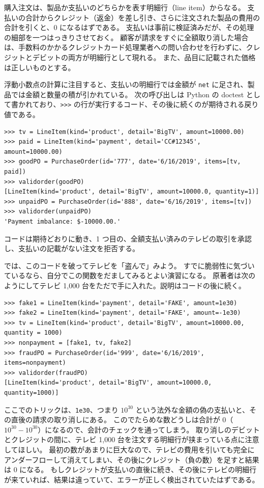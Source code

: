 \documentclass[uplatex]{jsarticle}
\def\label#1{}%
\begin{document}
購入注文は、製品か支払いのどちらかを表す明細行（line item）からなる。
支払いの合計からクレジット（返金）を差し引き、さらに注文された製品の費用の合計を引くと、0 になるはずである。
支払いは事前に検証済みだが、その処理の細部を一つはっきりさせておく。
顧客が請求をすぐに全額取り消した場合は、手数料のかかるクレジットカード処理業者への問い合わせを行わずに、クレジットとデビットの両方が明細行として現れる。
また、品目に記載された価格は正しいものとする。

浮動小数点の計算に注目すると、支払いの明細行では金額が \texttt{net} に足され、製品では金額と数量の積が引かれている。
次の呼び出しは Python の doctest として書かれており、\verb|>>>| の行が実行するコード、その後に続くのが期待される戻り値である。

\begin{verbatim}
>>> tv = LineItem(kind='product', detail='BigTV', amount=10000.00)
>>> paid = LineItem(kind='payment', detail='CC#12345', amount=10000.00)
>>> goodPO = PurchaseOrder(id='777', date='6/16/2019', items=[tv, paid])
>>> validorder(goodPO)
[LineItem(kind='product', detail='BigTV', amount=10000.0, quantity=1)]
>>> unpaidPO = PurchaseOrder(id='888', date='6/16/2019', items=[tv])
>>> validorder(unpaidPO)
'Payment imbalance: $-10000.00.'
\end{verbatim}

コードは期待どおりに動き、1 つ目の、全額支払い済みのテレビの取引を承認し、支払いの記載がない注文を拒否する。

では、このコードを破ってテレビを「盗んで」みよう。
すでに脆弱性に気づいているなら、自分でこの関数をだましてみるとよい演習になる。
原著者は次のようにしてテレビ 1,000 台をただで手に入れた。説明はコードの後に続く。

\begin{exa}[アンダーフローを悪用した不正な注文]\label{exa:ch9-fraud-po}
\begin{verbatim}
>>> fake1 = LineItem(kind='payment', detail='FAKE', amount=1e30)
>>> fake2 = LineItem(kind='payment', detail='FAKE', amount=-1e30)
>>> tv = LineItem(kind='product', detail='BigTV', amount=10000.00, quantity = 1000)
>>> nonpayment = [fake1, tv, fake2]
>>> fraudPO = PurchaseOrder(id='999', date='6/16/2019', items=nonpayment)
>>> validorder(fraudPO)
[LineItem(kind='product', detail='BigTV', amount=10000.0, quantity=1000)]
\end{verbatim}
ここでのトリックは、\texttt{1e30}、つまり $10^{30}$ という法外な金額の偽の支払いと、その直後の請求の取り消しにある。
このでたらめな数どうしは合計が 0（$10^{30} - 10^{30}$）になるので、会計のチェックを通ってしまう。
取り消しのデビットとクレジットの間に、テレビ 1,000 台を注文する明細行が挟まっている点に注意してほしい。
最初の数があまりに巨大なので、テレビの費用を引いても完全にアンダーフローして消えてしまい、その後にクレジット（負の数）を足すと結果は 0 になる。
もしクレジットが支払いの直後に続き、その後にテレビの明細行が来ていれば、結果は違っていて、エラーが正しく検出されていたはずである。
\end{exa}
\end{document}

